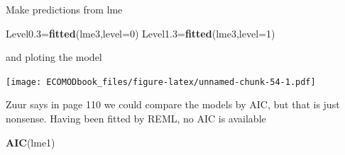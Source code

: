 \documentclass[
]{book}
\newenvironment{Shaded}{\begin{snugshade}}{\end{snugshade}}
\newcommand{\AttributeTok}[1]{\textcolor[rgb]{0.13,0.29,0.53}{#1}}
\newcommand{\CommentTok}[1]{\textcolor[rgb]{0.56,0.35,0.01}{\textit{#1}}}
\newcommand{\ControlFlowTok}[1]{\textcolor[rgb]{0.13,0.29,0.53}{\textbf{#1}}}
\newcommand{\DecValTok}[1]{\textcolor[rgb]{0.00,0.00,0.81}{#1}}
\newcommand{\FloatTok}[1]{\textcolor[rgb]{0.00,0.00,0.81}{#1}}
\newcommand{\FunctionTok}[1]{\textcolor[rgb]{0.13,0.29,0.53}{\textbf{#1}}}
\newcommand{\NormalTok}[1]{#1}
\newcommand{\OtherTok}[1]{\textcolor[rgb]{0.56,0.35,0.01}{#1}}
\newcommand{\SpecialCharTok}[1]{\textcolor[rgb]{0.81,0.36,0.00}{\textbf{#1}}}
\begin{document}
Make predictions from lme

\begin{Shaded}
\begin{Highlighting}[]
\NormalTok{Level0}\FloatTok{.3}\OtherTok{=}\FunctionTok{fitted}\NormalTok{(lme3,}\AttributeTok{level=}\DecValTok{0}\NormalTok{)}
\NormalTok{Level1}\FloatTok{.3}\OtherTok{=}\FunctionTok{fitted}\NormalTok{(lme3,}\AttributeTok{level=}\DecValTok{1}\NormalTok{)}
\end{Highlighting}
\end{Shaded}

and ploting the model

\begin{Shaded}
\end{Shaded}

\texttt{[image: ECOMODbook\_files/figure-latex/unnamed-chunk-54-1.pdf]}

Zuur says in page 110 we could compare the models by AIC, but that is just nonsense. Having been fitted by REML, no AIC is available

\begin{Shaded}
\begin{Highlighting}[]
\FunctionTok{AIC}\NormalTok{(lme1)}
\end{Highlighting}
\end{Shaded}
\end{document}
